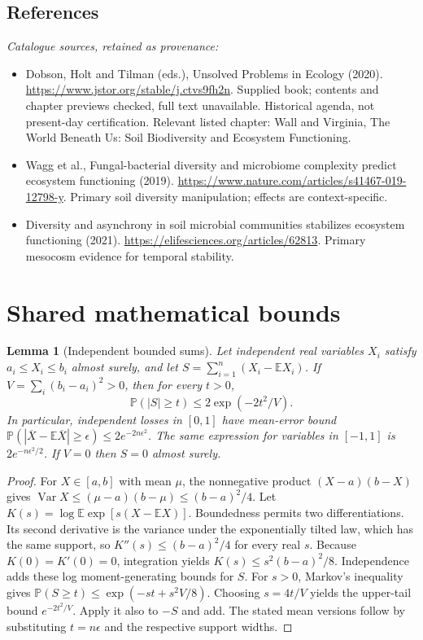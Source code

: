 \documentclass[11pt]{article}
\newcommand{\E}{\mathbb E}
\newcommand{\Prob}{\mathbb P}
\DeclareMathOperator{\Var}{Var}
\providecommand{\E}{\mathbb E}
\providecommand{\Prob}{\mathbb P}
\providecommand{\Var}{\operatorname{Var}}
\newtheorem{sharedlemma}{Lemma}[section]
\begin{document}
\subsection{References}
\noindent\emph{Catalogue sources, retained as provenance:}
\begin{itemize}
\item Dobson, Holt and Tilman (eds.), Unsolved Problems in Ecology (2020). \url{https://www.jstor.org/stable/j.ctvs9fh2n}. Supplied book; contents and chapter previews checked, full text unavailable. Historical agenda, not present-day certification. Relevant listed chapter: Wall and Virginia, The World Beneath Us: Soil Biodiversity and Ecosystem Functioning.
\item Wagg et al., Fungal-bacterial diversity and microbiome complexity predict ecosystem functioning (2019). \url{https://www.nature.com/articles/s41467-019-12798-y}. Primary soil diversity manipulation; effects are context-specific.
\item Diversity and asynchrony in soil microbial communities stabilizes ecosystem functioning (2021). \url{https://elifesciences.org/articles/62813}. Primary mesocosm evidence for temporal stability.
\end{itemize}
\clearpage


\appendix
\section{Shared mathematical bounds}\label{app:bounds}
\begin{sharedlemma}[Independent bounded sums]\label{lem:bounded}
Let independent real variables $X_i$ satisfy $a_i\leq X_i\leq b_i$ almost surely,
and let $S=\sum_{i=1}^n(X_i-\E X_i)$. If
$V=\sum_i(b_i-a_i)^2>0$, then for every $t>0$,
\[
 \Prob(|S|\geq t)\leq 2\exp(-2t^2/V).
\]
In particular, independent losses in $[0,1]$ have mean-error bound
$\Prob(|\overline X-\E\overline X|\geq\epsilon)
\leq2e^{-2n\epsilon^2}$. The same expression for variables in $[-1,1]$
is $2e^{-n\epsilon^2/2}$. If $V=0$ then $S=0$ almost surely.
\end{sharedlemma}
\begin{proof}
For $X\in[a,b]$ with mean $\mu$, the nonnegative product
$(X-a)(b-X)$ gives
$\Var X\leq(\mu-a)(b-\mu)\leq(b-a)^2/4$.
Let $K(s)=\log\E\exp[s(X-\E X)]$.
Boundedness permits two differentiations. Its second derivative is the variance
under the exponentially tilted law, which has the same support, so
$K''(s)\leq(b-a)^2/4$ for every real $s$.
Because $K(0)=K'(0)=0$, integration yields
$K(s)\leq s^2(b-a)^2/8$.
Independence adds these log moment-generating bounds for $S$.
For $s>0$, Markov's inequality gives
$\Prob(S\geq t)\leq\exp(-st+s^2V/8)$.
Choosing $s=4t/V$ yields the upper-tail bound $e^{-2t^2/V}$.
Apply it also to $-S$ and add. The stated mean versions follow by substituting
$t=n\epsilon$ and the respective support widths.
\end{proof}
\end{document}
